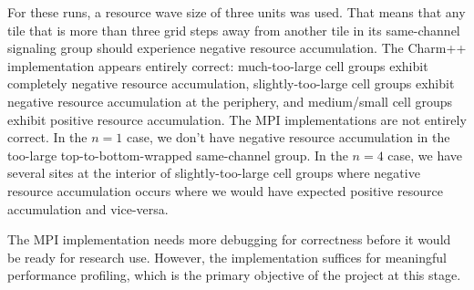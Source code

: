 For these runs, a resource wave size of three units was used.
That means that any tile that is more than three grid steps away from another tile in its same-channel signaling group should experience negative resource accumulation.
The Charm++ implementation appears entirely correct: much-too-large cell groups exhibit completely negative resource accumulation, slightly-too-large cell groups exhibit negative resource accumulation at the periphery, and medium/small cell groups exhibit positive resource accumulation.
The MPI implementations are not entirely correct.
In the $n=1$ case, we don't have negative resource accumulation in the too-large top-to-bottom-wrapped same-channel group.
In the $n=4$ case, we have several sites at the interior of slightly-too-large cell groups where negative resource accumulation occurs where we would have expected positive resource accumulation and vice-versa.

The MPI implementation needs more debugging for correctness before it would be ready for research use.
However, the implementation suffices for meaningful performance profiling, which is the primary objective of the project at this stage.
